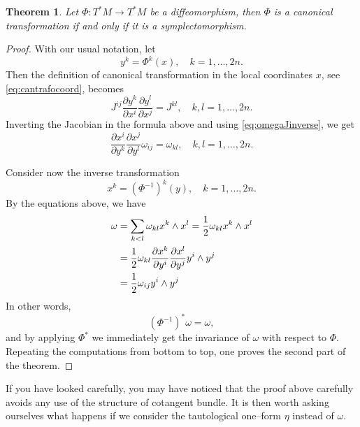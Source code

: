 \documentclass[english,fontsize=11pt,paper=a5,oneside]{scrbook}
\let\d\relax
\DeclareMathOperator{\d}{d}
\newtheorem{theorem}{Theorem}[chapter]
\theoremstyle{definition}
\begin{document}
\begin{theorem}\label{thm:ctiffs}
    Let $\Phi: T^*M \to T^*M$ be a diffeomorphism, then $\Phi$ is a canonical transformation if and only if it is a symplectomorphism.
\end{theorem}
\begin{proof}
    With our usual notation, let 
    \begin{equation}
        y^k = \Phi^k(x),\quad k=1,\ldots,2n.
    \end{equation}
    Then the definition of canonical transformation in the local coordinates $x$, see \eqref{eq:cantrafocoord}, becomes
    \begin{equation}
        J^{ij}\frac{\partial y^k}{\partial x^i}\frac{\partial y^l}{\partial x^j} = J^{kl},
        \quad k,l = 1,\ldots,2n.
    \end{equation}
    Inverting the Jacobian in the formula above and using \eqref{eq:omegaJinverse}, we get
    \begin{equation}
        \frac{\partial x^i}{\partial y^k}\frac{\partial x^j}{\partial y^l} \omega_{ij}= \omega_{kl},
        \quad k,l = 1,\ldots,2n.
    \end{equation}

    Consider now the inverse transformation 
    \begin{equation}
        x^k = \left(\Phi^{-1}\right)^k(y),\quad k=1,\ldots,2n.
    \end{equation}
    By the equations above, we have
    \begin{align}
        \omega 
        &= \sum_{k<l} \omega_{kl}\d x^k \wedge \d x^l
        = \frac12 \omega_{kl} \d x^k \wedge \d x^l \\
        &= \frac12 \omega_{kl} \frac{\partial x^k}{\partial y^i}\frac{\partial x^l}{\partial y^j} \d y^i \wedge \d y^j \\
        &= \frac12 \omega_{ij} \d y^i \wedge \d y^j
    \end{align}
    In other words,
    \begin{equation}
        \left(\Phi^{-1}\right)^* \omega = \omega,
    \end{equation}
    and by applying $\Phi^*$ we immediately get the invariance of $\omega$ with respect to $\Phi$. 
    Repeating the computations from bottom to top, one proves the second part of the theorem.
\end{proof}

If you have looked carefully, you may have noticed that the proof above carefully avoids any use of the structure of cotangent bundle.
It is then worth asking ourselves what happens if we consider the tautological one--form $\eta$ instead of $\omega$.
\end{document}
